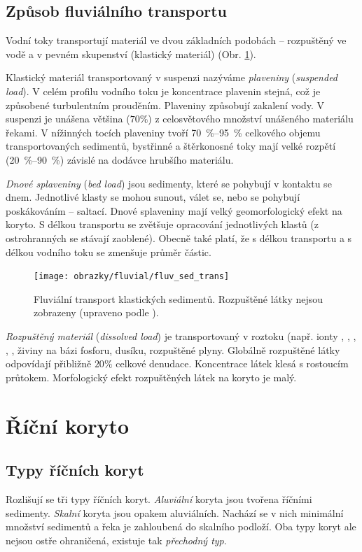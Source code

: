 \subsection{Způsob fluviálního transportu}
Vodní toky transportují materiál ve dvou základních podobách -- rozpuštěný ve vodě a v pevném skupenství (klastický materiál) (Obr. \ref{fig:fluvsedtrans}). 

Klastický materiál transportovaný v suspenzi nazýváme \emph{plaveniny} (\textit{suspended load}).  V celém profilu vodního toku je koncentrace plavenin stejná, což je způsobené turbulentním prouděním. Plaveniny způsobují zakalení vody. V suspenzi je unášena většina ($70 \%$) z celosvětového množství unášeného materiálu řekami. V nížinných tocích plaveniny tvoří \SIrange{70}{95}{\percent} celkového objemu transportovaných sedimentů, bystřinné a štěrkonosné toky mají velké rozpětí (\SIrange{20}{90}{\percent}) závislé na dodávce hrubšího materiálu. 

\emph{Dnové splaveniny} (\textit{bed load}) jsou sedimenty, které se pohybují v kontaktu se dnem. Jednotlivé klasty se mohou sunout, válet se, nebo se pohybují poskákováním -- saltací. Dnové splaveniny mají velký geomorfologický efekt na koryto. S délkou transportu se zvětšuje opracování jednotlivých klastů (z ostrohranných se stávají zaoblené). Obecně také platí, že s délkou transportu a s délkou vodního toku se zmenšuje průměr částic.

\begin{figure}
	\centering
	\texttt{[image: obrazky/fluvial/fluv\_sed\_trans]}
	\caption{Fluviální transport klastických sedimentů. Rozpuštěné látky nejsou zobrazeny (upraveno podle \textcite{charltonFundamentalsFluvialGeomorphology2007}).}
	\label{fig:fluvsedtrans}
\end{figure}

\emph{Rozpuštěný materiál} (\textit{dissolved load}) je transportovaný v roztoku (např. ionty , , , , , živiny na bázi fosforu, dusíku, rozpuštěné plyny. Globálně rozpuštěné látky odpovídají přibližně $20 \%$ celkové denudace. Koncentrace látek klesá s rostoucím průtokem. Morfologický efekt rozpuštěných látek na koryto je malý. 


\section{Říční koryto}
\subsection{Typy říčních koryt}
Rozlišují se tři typy říčních koryt. \emph{Aluviální} koryta jsou tvořena říčními sedimenty. \emph{Skalní} koryta jsou opakem aluviálních. Nachází se v nich minimální množství sedimentů a řeka je zahloubená do skalního podloží. Oba typy koryt ale nejsou ostře ohraničená, existuje tak \emph{přechodný typ}. 

